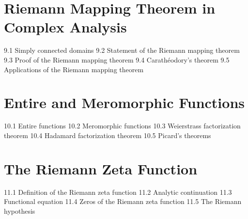 \section{Riemann Mapping Theorem in Complex Analysis}
9.1 Simply connected domains
9.2 Statement of the Riemann mapping theorem
9.3 Proof of the Riemann mapping theorem
9.4 Carathéodory's theorem
9.5 Applications of the Riemann mapping theorem
\section{Entire and Meromorphic Functions}
10.1 Entire functions
10.2 Meromorphic functions
10.3 Weierstrass factorization theorem
10.4 Hadamard factorization theorem
10.5 Picard's theorems
\section{The Riemann Zeta Function}
11.1 Definition of the Riemann zeta function
11.2 Analytic continuation
11.3 Functional equation
11.4 Zeros of the Riemann zeta function
11.5 The Riemann hypothesis
